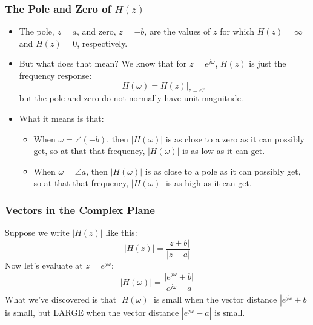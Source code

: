 \documentclass{beamer}
\begin{document}
\begin{frame}
  \frametitle{The Pole and Zero of $H(z)$}

  \begin{itemize}
  \item The pole, $z=a$, and zero, $z=-b$, are the values of $z$ for which
    $H(z)=\infty$  and $H(z)=0$, respectively.
  \item But what does that mean?  We know that for $z=e^{j\omega}$,
    $H(z)$ is just the frequency response:
    \[
    H(\omega) = H(z)\vert_{z=e^{j\omega}}
    \]
    but the pole and zero do not normally have unit magnitude.
  \item What it means is that:
    \begin{itemize}
      \item When $\omega=\angle (-b)$, then
        $|H(\omega)|$ is as close to a zero as it can possibly get, so at that 
        that frequency, $|H(\omega)|$ is as low as it can get.
      \item When $\omega=\angle a$, then
        $|H(\omega)|$ is as close to a pole as it can possibly get, so at that 
        that frequency, $|H(\omega)|$ is as high as it can get.
    \end{itemize}
  \end{itemize}
\end{frame}

\begin{frame}
  \centerline{}
\end{frame}

\begin{frame}
  \centerline{}
\end{frame}

\begin{frame}
  \frametitle{Vectors in the Complex Plane}

  Suppose we write $|H(z)|$ like this:
  \[
  \vert H(z)\vert = \frac{\vert z+b\vert}{\vert z-a\vert}
  \]
  Now let's evaluate at $z=e^{j\omega}$:
  \[
  \vert H(\omega)\vert = 
  \frac{\vert e^{j\omega}+b\vert}{\vert e^{j\omega}-a\vert}
  \]
  What we've discovered is that $|H(\omega)|$ is small when the vector
  distance $|e^{j\omega}+b|$ is small, but LARGE when the vector
  distance $|e^{j\omega}-a|$ is small.
\end{frame}

\begin{frame}
  \centerline{}
\end{frame}
\end{document}
